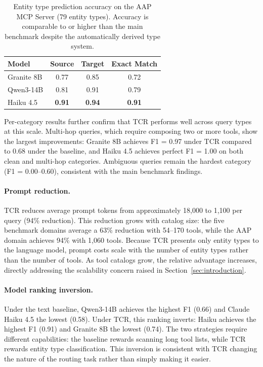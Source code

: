 \begin{table}[t]
\centering
\small
\begin{tabular}{l c c c}
\toprule
\textbf{Model} & \textbf{Source} & \textbf{Target} & \textbf{Exact Match} \\
\midrule
Granite 8B   & 0.77 & 0.85 & 0.72 \\
Qwen3-14B    & 0.81 & 0.91 & 0.79 \\
Haiku 4.5    & \textbf{0.91} & \textbf{0.94} & \textbf{0.91} \\
\bottomrule
\end{tabular}
\caption{Entity type prediction accuracy on the AAP MCP Server (79 entity types). Accuracy is comparable to or higher than the main benchmark despite the automatically derived type system.}
\label{tab:aap-type-prediction}
\end{table}

Per-category results further confirm that TCR performs well across query types at this scale.
Multi-hop queries, which require composing two or more tools, show the largest improvements: Granite 8B achieves F1 = 0.97 under TCR compared to 0.68 under the baseline, and Haiku 4.5 achieves perfect F1 = 1.00 on both clean and multi-hop categories.
Ambiguous queries remain the hardest category (F1 = 0.00--0.60), consistent with the main benchmark findings.

\paragraph{Prompt reduction.}

TCR reduces average prompt tokens from approximately 18,000 to 1,100 per query (94\% reduction).
This reduction grows with catalog size: the five benchmark domains average a 63\% reduction with 54--170 tools, while the AAP domain achieves 94\% with 1,060 tools.
Because TCR presents only entity types to the language model, prompt costs scale with the number of entity types rather than the number of tools.
As tool catalogs grow, the relative advantage increases, directly addressing the scalability concern raised in Section~\ref{sec:introduction}.

\paragraph{Model ranking inversion.}

Under the text baseline, Qwen3-14B achieves the highest F1 (0.66) and Claude Haiku 4.5 the lowest (0.58).
Under TCR, this ranking inverts: Haiku achieves the highest F1 (0.91) and Granite 8B the lowest (0.74).
The two strategies require different capabilities: the baseline rewards scanning long tool lists, while TCR rewards entity type classification.
This inversion is consistent with TCR changing the nature of the routing task rather than simply making it easier.

